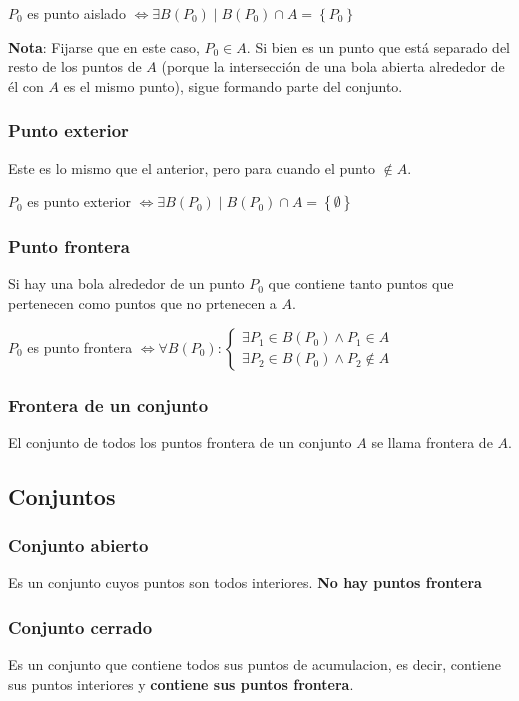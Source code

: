 \documentclass[12pt]{article}
\begin{document}
$ P_{0} $ es punto aislado $ \iff \exists B(P_{0})\mid B(P_{0}) \cap A = \left\{P_{0}\right\} $

\textbf{Nota}: Fijarse que en este caso, $ P_{0} \in A $. Si bien es un punto que está separado del resto de los puntos de $ A $ (porque la intersección de una bola abierta alrededor de él con $ A $ es el mismo punto), sigue formando parte del conjunto.

\subsubsection{Punto exterior}
Este es lo mismo que el anterior, pero para cuando el punto $ \notin A $.

$ P_{0} $ es punto exterior $ \iff \exists B(P_{0}) \mid B(P_{0}) \cap A = \left\{\emptyset \right\} $

\subsubsection{Punto frontera}
Si hay una bola alrededor de un punto $ P_{0} $ que contiene tanto puntos que pertenecen como puntos que no prtenecen a $ A $.

$ P_{0} $ es punto frontera $ \iff \forall B(P_{0}):
	\begin{cases}
		\exists P_{1} \in B(P_{0}) \land P_{1}\in A \\
		\exists P_{2} \in B(P_{0}) \land P_{2} \notin A
	\end{cases}$

\subsubsection{Frontera de un conjunto}
El conjunto de todos los puntos frontera de un conjunto $ A $ se llama frontera de $ A $.

\subsection{Conjuntos}
\subsubsection{Conjunto abierto}
Es un conjunto cuyos puntos son todos interiores. \textbf{No hay puntos frontera}

\subsubsection{Conjunto cerrado}
Es un conjunto que contiene todos sus puntos de acumulacion, es decir, contiene sus puntos interiores y \textbf{contiene sus puntos frontera}.
\end{document}
